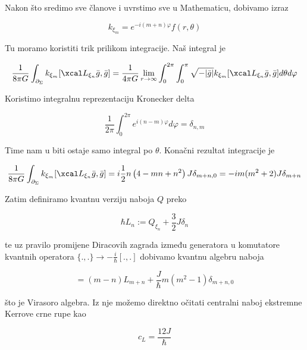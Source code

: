 


\noindent Nakon što sredimo sve članove i uvrstimo sve u Mathematicu, dobivamo izraz

\begin{equation*}
k_{\xi_m}=e^{-i(m+n)\varphi}f(r,\theta)
\end{equation*}

\noindent Tu moramo koristiti trik prilikom integracije. Naš integral je 

\begin{equation}
\frac{1}{8\pi G}\int_{\partial_\Sigma}k_{\xi_m}[\Lie_{\xi_n}\bar{g},\bar{g}]=\frac{1}{4\pi G}\lim\limits_{r\to\infty}\int_{0}^{2\pi}\int_{0}^{\pi}\sqrt{-|\bar{g}|} k_{\xi_m}[\Lie_{\xi_n}\bar{g},\bar{g}]  d\theta d\varphi
\end{equation}

\noindent Koristimo integralnu reprezentaciju Kronecker delta

\begin{equation}
\frac{1}{2\pi}\int_{0}^{2\pi}e^{i(n-m)\varphi}d\varphi=\delta_{n,m}
\end{equation}

\noindent Time nam u biti ostaje samo integral po $\theta$. Konačni rezultat integracije je

\begin{equation}
\frac{1}{8\pi G}\int_{\partial_\Sigma}k_{\xi_m}[\Lie_{\xi_n}\bar{g},\bar{g}]=i\frac{1}{2}n\left(4-m n+n^2\right)J\delta_{m+n,0}=-im(m^2+2)J\delta_{m+n}
\end{equation}

\noindent Zatim definiramo kvantnu verziju naboja $Q$ preko

\begin{equation*}
\hbar L_n:=Q_{\xi_n}+\frac{3}{2}J\delta_n
\end{equation*}

\noindent te uz pravilo promijene Diracovih zagrada između generatora u komutatore kvantnih operatora $\{.,.\}\to-\frac{i}{\hbar}[.,.]$ dobivamo kvantnu algebru naboja 

\begin{equation}
[L_m,L_n]=(m-n)L_{m+n}+\frac{J}{\hbar}m(m^2-1)\delta_{m+n,0}
\end{equation}

\noindent što je Virasoro algebra. Iz nje možemo direktno očitati centralni naboj ekstremne Kerrove crne rupe kao

\begin{equation}
c_L=\frac{12J}{\hbar}
\end{equation}




